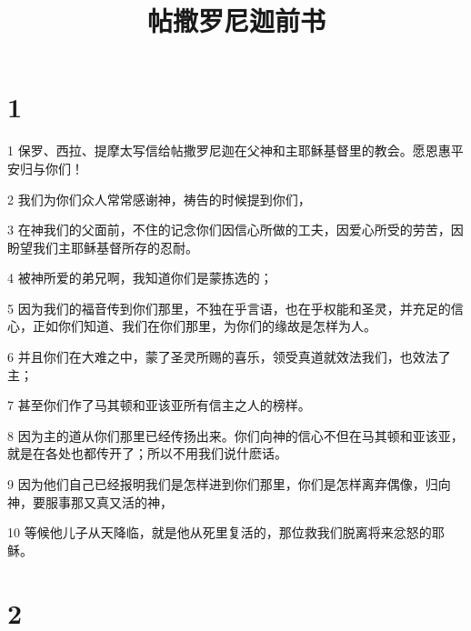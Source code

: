 

\title{帖撒罗尼迦前书}


\chapter{1}

\par 1 保罗、西拉、提摩太写信给帖撒罗尼迦在父神和主耶稣基督里的教会。愿恩惠平安归与你们！
\par 2 我们为你们众人常常感谢神，祷告的时候提到你们，
\par 3 在神我们的父面前，不住的记念你们因信心所做的工夫，因爱心所受的劳苦，因盼望我们主耶稣基督所存的忍耐。
\par 4 被神所爱的弟兄啊，我知道你们是蒙拣选的；
\par 5 因为我们的福音传到你们那里，不独在乎言语，也在乎权能和圣灵，并充足的信心，正如你们知道、我们在你们那里，为你们的缘故是怎样为人。
\par 6 并且你们在大难之中，蒙了圣灵所赐的喜乐，领受真道就效法我们，也效法了主；
\par 7 甚至你们作了马其顿和亚该亚所有信主之人的榜样。
\par 8 因为主的道从你们那里已经传扬出来。你们向神的信心不但在马其顿和亚该亚，就是在各处也都传开了；所以不用我们说什麽话。
\par 9 因为他们自己已经报明我们是怎样进到你们那里，你们是怎样离弃偶像，归向神，要服事那又真又活的神，
\par 10 等候他儿子从天降临，就是他从死里复活的，那位救我们脱离将来忿怒的耶稣。

\chapter{2}

